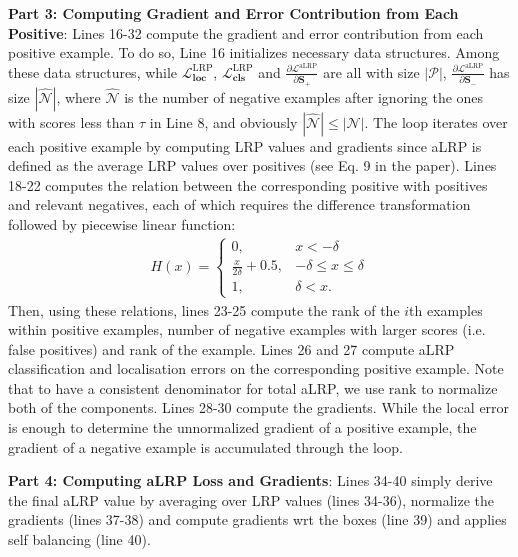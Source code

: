 \documentclass{article}
\begin{document}
\textbf{Part 3: Computing Gradient and Error Contribution from Each Positive}: Lines 16-32 compute the gradient and error contribution from each positive example. To do so, Line 16 initializes necessary data structures. Among these data structures, while  $\mathbf{\mathcal{L}^\mathrm{LRP}_{loc}}$, $\mathbf{\mathcal{L}^\mathrm{LRP}_{cls}}$ and $\frac{\partial \mathcal{L}^\mathrm{aLRP}}{ \partial \mathbf{S_+}}$ are all with size $|\mathcal{P}|$, $\frac{\partial \mathcal{L}^\mathrm{aLRP}}{ \partial \mathbf{S_-}}$ has size $|\hat{\mathcal{N}}|$, where $\hat{\mathcal{N}}$ is the number of negative examples after ignoring the ones with scores less than $\tau$ in Line 8, and obviously $|\hat{\mathcal{N}}| \leq |\mathcal{N}|$. The loop iterates over each positive example by computing LRP values and gradients since aLRP is defined as the average LRP values over positives (see Eq. 9 in the paper). Lines 18-22 computes the relation between the corresponding positive with positives and relevant negatives, each of which requires the difference transformation followed by piecewise linear function:
\begin{align}
    \label{eq:PiecewiseLinear}
    H(x) = \begin{cases} 
      0,  &  x < -\delta \\
      \frac{x}{2 \delta}+0.5, &  -\delta \leq x \leq \delta \\
      1, &  \delta < x.
      \end{cases}
\end{align}
Then, using these relations, lines 23-25 compute the rank of the $i$th examples within positive examples, number of negative examples with larger scores (i.e. false positives) and rank of the example. Lines 26 and 27 compute aLRP classification and localisation errors on the corresponding positive example. Note that to have a consistent denominator for total aLRP, we use $\mathrm{rank}$ to normalize both of the components. Lines 28-30 compute the gradients. While the local error is enough to determine the unnormalized gradient of a positive example, the gradient of a negative example is accumulated through the loop.

\textbf{Part 4: Computing aLRP Loss and Gradients}: Lines 34-40 simply derive the final aLRP value by averaging over LRP values (lines 34-36), normalize the gradients (lines 37-38) and compute gradients wrt the boxes (line 39) and applies self balancing (line 40).
\end{document}
